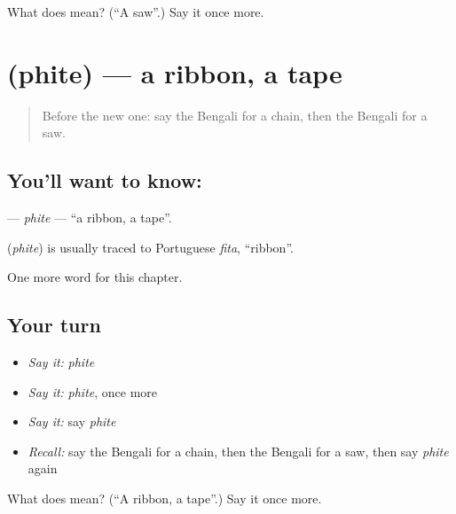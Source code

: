 \begin{tcolorbox}[breakable,colback=teal!4,colframe=teal!35!black,title={Before you move on}]
What does  mean? (\textquotedblleft{}A saw\textquotedblright{}.) Say it once more.
\end{tcolorbox}
\section[\texorpdfstring{\bn{ফিতে} (phite)}{ফিতে (phite)}]{ (phite) — a ribbon, a tape}

\label{lesson:BN-C229-phite}



\begin{quote}
Before the new one: say the Bengali for a chain, then the Bengali for a saw.
\end{quote}

\subsection*{You'll want to know: }
\textbf{} — \emph{phite} — \textquotedblleft{}a ribbon, a tape\textquotedblright{}.

\begin{cousinweb}
\textbf{} (\emph{phite}) is usually traced to Portuguese \emph{fita}, \textquotedblleft{}ribbon\textquotedblright{}.
\end{cousinweb}

\begin{grammarlens}[title={What you've built}]
One more word for this chapter.
\end{grammarlens}

\subsection*{Your turn}
\begin{itemize}
\raggedright
  \item \emph{Say it:} \emph{phite}
  \item \emph{Say it:} \emph{phite}, once more
  \item \emph{Say it:} say \emph{phite}
  \item \emph{Recall:} say the Bengali for a chain, then the Bengali for a saw, then say \emph{phite} again
\end{itemize}

\begin{tcolorbox}[breakable,colback=teal!4,colframe=teal!35!black,title={Before you move on}]
What does  mean? (\textquotedblleft{}A ribbon, a tape\textquotedblright{}.) Say it once more.
\end{tcolorbox}
